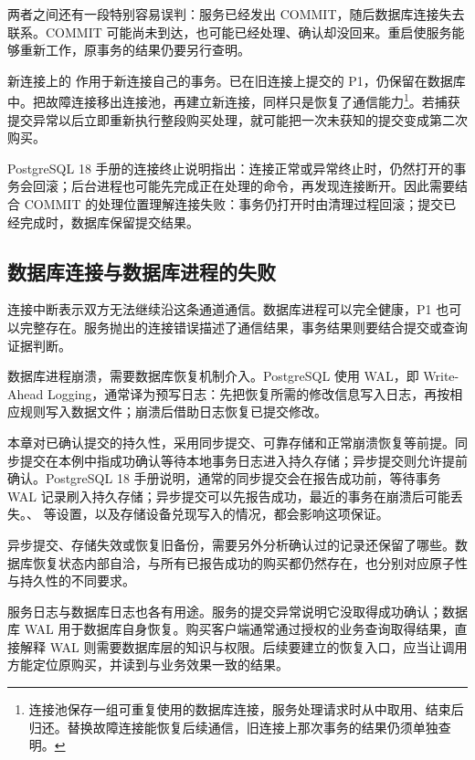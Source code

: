 两者之间还有一段特别容易误判：服务已经发出 COMMIT，随后数据库连接失去联系。COMMIT 可能尚未到达，也可能已经处理、确认却没回来。重启使服务能够重新工作，原事务的结果仍要另行查明。

新连接上的  作用于新连接自己的事务。已在旧连接上提交的 P1，仍保留在数据库中。把故障连接移出连接池，再建立新连接，同样只是恢复了通信能力\footnote{连接池保存一组可重复使用的数据库连接，服务处理请求时从中取用、结束后归还。替换故障连接能恢复后续通信，旧连接上那次事务的结果仍须单独查明。}。若捕获提交异常以后立即重新执行整段购买处理，就可能把一次未获知的提交变成第二次购买。



PostgreSQL 18 手册的连接终止说明指出：连接正常或异常终止时，仍然打开的事务会回滚；后台进程也可能先完成正在处理的命令，再发现连接断开\cite{pg}。因此需要结合 COMMIT 的处理位置理解连接失败：事务仍打开时由清理过程回滚；提交已经完成时，数据库保留提交结果。

\subsection*{数据库连接与数据库进程的失败}

连接中断表示双方无法继续沿这条通道通信。数据库进程可以完全健康，P1 也可以完整存在。服务抛出的连接错误描述了通信结果，事务结果则要结合提交或查询证据判断。

数据库进程崩溃，需要数据库恢复机制介入。PostgreSQL 使用 WAL，即 Write-Ahead Logging，通常译为预写日志：先把恢复所需的修改信息写入日志，再按相应规则写入数据文件；崩溃后借助日志恢复已提交修改。

本章对已确认提交的持久性，采用同步提交、可靠存储和正常崩溃恢复等前提。同步提交在本例中指成功确认等待本地事务日志进入持久存储；异步提交则允许提前确认。PostgreSQL 18 手册说明，通常的同步提交会在报告成功前，等待事务 WAL 记录刷入持久存储；异步提交可以先报告成功，最近的事务在崩溃后可能丢失。、 等设置，以及存储设备兑现写入的情况，都会影响这项保证\cite{pg}。

异步提交、存储失效或恢复旧备份，需要另外分析确认过的记录还保留了哪些。数据库恢复状态内部自洽，与所有已报告成功的购买都仍然存在，也分别对应原子性与持久性的不同要求。

服务日志与数据库日志也各有用途。服务的提交异常说明它没取得成功确认；数据库 WAL 用于数据库自身恢复。购买客户端通常通过授权的业务查询取得结果，直接解释 WAL 则需要数据库层的知识与权限。后续要建立的恢复入口，应当让调用方能定位原购买，并读到与业务效果一致的结果。


